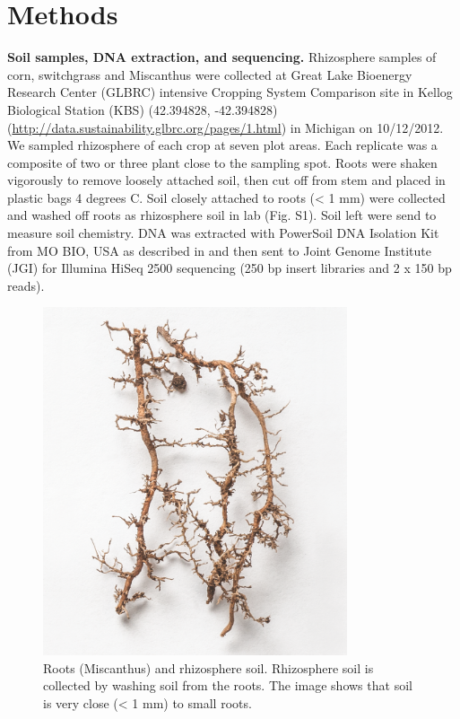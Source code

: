 \documentclass[]{msu-thesis}
\begin{document}
\section{Methods}

\textbf{Soil samples, DNA extraction, and sequencing.} Rhizosphere samples of corn, switchgrass and Miscanthus were collected at Great Lake Bioenergy Research Center (GLBRC) intensive Cropping System Comparison site in Kellog Biological Station (KBS) (42.394828, -42.394828) (\url{http://data.sustainability.glbrc.org/pages/1.html}) in Michigan on 10/12/2012. We sampled rhizosphere of each crop at seven plot areas. Each replicate was a composite of two or three plant close to the sampling spot. Roots were shaken vigorously to remove loosely attached soil, then cut off from stem and placed in plastic bags 4 degrees C. Soil closely attached to roots (< 1 mm) were collected and washed off roots as rhizosphere soil in lab (Fig. S1). Soil left were send to measure soil chemistry. DNA was extracted with PowerSoil DNA Isolation Kit from MO BIO, USA as described in \cite{jesus_influence_2015} and then sent to Joint Genome Institute (JGI) for Illumina HiSeq 2500 sequencing (250 bp insert libraries and 2 x 150 bp reads).

\begin{figure}[tbph!]
  \centering
  \includegraphics[width=0.80\textwidth]{figs/chap4-root-M}
  \caption[Roots (Miscanthus) and rhizosphere soil]{Roots (Miscanthus) and rhizosphere soil. Rhizosphere soil is collected by washing soil from the roots. The image shows that soil is very close (< 1 mm) to small roots.}
  \label{fig:chap4FigS1}
\end{figure}
\end{document}
